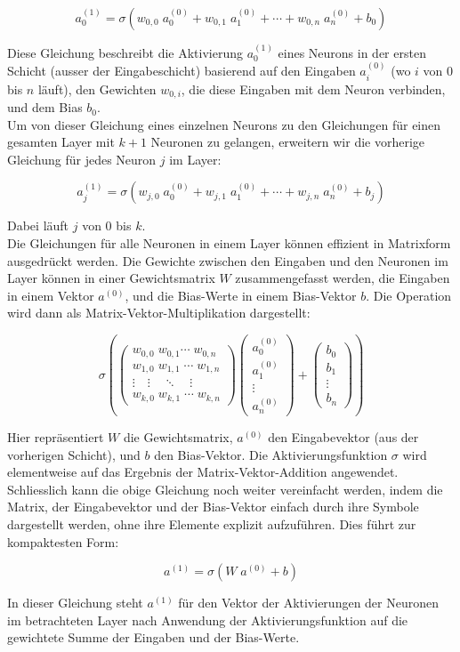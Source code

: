 \[a_{0}^{(1)} = \sigma(w_{0,0}\; a_{0}^{(0)} + w_{0,1}\; a_{1}^{(0)} + \cdots + w_{0,n}\; a_{n} ^{(0)} + b_{0})\]

\noindent Diese Gleichung beschreibt die Aktivierung $a_0^{(1)}$ eines Neurons in der ersten Schicht (ausser der Eingabeschicht) basierend auf den Eingaben $a_{i}^{(0)}$ (wo $i$ von $0$ bis $n$ läuft), den Gewichten $w_{0,i}$, die diese Eingaben mit dem Neuron verbinden, und dem Bias $b_0$.
\\
Um von dieser Gleichung eines einzelnen Neurons zu den Gleichungen für einen gesamten Layer mit $k+1$ Neuronen zu gelangen, erweitern wir die vorherige Gleichung für jedes Neuron $j$ im Layer:

\[a_j^{(1)}=\sigma(w_{j,0}\; a_0^{(0)} + w_{j,1}\; a_1^{(0)} + \cdots + w_{j,n}\; a_n^{(0)} + b_j)\]

\noindent Dabei läuft $j$ von $0$ bis $k$.
\\
Die Gleichungen für alle Neuronen in einem Layer können effizient in Matrixform ausgedrückt werden. Die Gewichte zwischen den Eingaben und den Neuronen im Layer können in einer Gewichtsmatrix $W$ zusammengefasst werden, die Eingaben in einem Vektor $a^{(0)}$, und die Bias-Werte in einem Bias-Vektor $b$. Die Operation wird dann als Matrix-Vektor-Multiplikation dargestellt:

\[\sigma(\left(\begin{array}{c} w_{0,0}\; w_{0,1}\! \cdots\; w_{0,n} \\ w_{1,0}\; w_{1,1}\; \cdots\; w_{1,n} \\ \vdots\quad  \vdots\quad  \ddots\quad  \vdots \\ w_{k,0}\; w_{k,1}\; \cdots\; w_{k,n}  \end{array}\right) \left(\begin{array}{c} a_{0} ^{(0)} \\ a_{1}^{(0)} \\ \vdots \\ a_{n}^{(0)} \end{array}\right) + \left(\begin{array}{c} b_{0} \\ b_{1} \\ \vdots \\ b_{n} \end{array}\right))\]

\noindent Hier repräsentiert $W$ die Gewichtsmatrix, $a^{(0)}$ den Eingabevektor (aus der vorherigen Schicht), und $b$ den Bias-Vektor. Die Aktivierungsfunktion $\sigma$ wird elementweise auf das Ergebnis der Matrix-Vektor-Addition angewendet.
\\
Schliesslich kann die obige Gleichung noch weiter vereinfacht werden, indem die Matrix, der Eingabevektor und der Bias-Vektor einfach durch ihre Symbole dargestellt werden, ohne ihre Elemente explizit aufzuführen. Dies führt zur kompaktesten Form:

\[a^{(1)} = \sigma(W\; a^{(0)} + b)\]

\noindent In dieser Gleichung steht $a^{(1)}$ für den Vektor der Aktivierungen der Neuronen im betrachteten Layer nach Anwendung der Aktivierungsfunktion auf die gewichtete Summe der Eingaben und der Bias-Werte.

